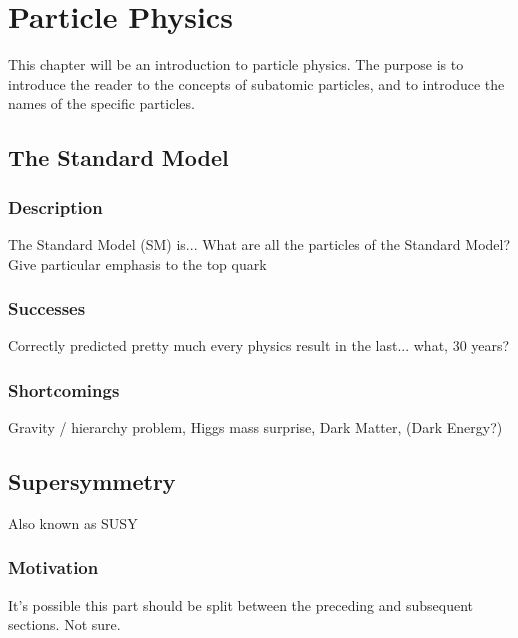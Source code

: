 \chapter{Particle Physics}
\label{chap:particlephysics}

This chapter will be an introduction to particle physics.
The purpose is to introduce the reader to the concepts of subatomic particles,
and to introduce the names of the specific particles.

\section{The Standard Model}
\label{sec:standardmodel}

\subsection{Description}
\label{ssec:SMdescription}

The Standard Model (SM) is...
What are all the particles of the Standard Model?
Give particular emphasis to the top quark

\subsection{Successes}
\label{ssec:SMsuccesses}

Correctly predicted pretty much every physics result in the last... what, 30 years?

\subsection{Shortcomings}
\label{ssec:SMshortcomings}

Gravity / hierarchy problem, Higgs mass surprise,
Dark Matter, (Dark Energy?)

\section{Supersymmetry}
\label{sec:susy}

Also known as SUSY

\subsection{Motivation}
\label{ssec:susymotivation}

It's possible this part should be split between the preceding and
subsequent sections. Not sure.

